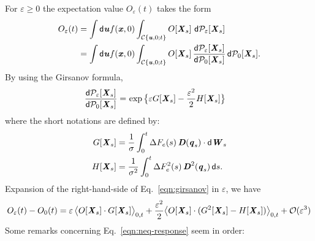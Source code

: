 \documentclass[aip,jcp,a4paper,reprint,onecolumn]{revtex4-1}
\newcommand{\vect}[1]{\textbf{\textit{#1}}}
\newcommand{\dd}{\textsf{d}}
\newcommand{\eps}{\varepsilon}
\newcommand{\mo}{\mathcal O}
\newcommand{\mc}{\mathcal C}
\begin{document}
For $\eps\ge 0$ the  expectation value $O_\eps(t)$ takes the form
\begin{align}
  O_\eps(t) & =
  \int \dd\vect u f(\vect x,0)
  \int_{\mc\{\vect u,0; t\}} O[\vect X_s]\,
  \, \dd\mathcal P_\eps[\vect X_s]   \\
& = \int \dd\vect u f(\vect x,0)
  \int_{\mc\{\vect u,0; t\}} O[\vect X_s]\,
  \frac{\dd {\mathcal P}_\eps[\vect X_s]}{\dd\mathcal P_0[\vect X_s]}
  \, \dd\mathcal P_0[\vect X_s] .   
\end{align}
By using the Girsanov formula, 
\begin{align}\label{eqn:girsanov}
  \frac
  {\dd{\mathcal P_\eps}[\vect X_s]}
  {\dd\mathcal P_0[\vect X_s]}  
  =&\,
  \exp
  \big\{{\eps G[\vect X_s] - \frac{\eps^2}{2} H[\vect X_s]}
  \big\}
\end{align}
where the short notations are defined by:
\begin{align}
  G[\vect X_s]
  &= \frac{1}\sigma\int_0^t
  \Delta F_e(s)\,\vect D(\vect q_s)\cdot\dd\vect W_s \\
  H[\vect X_s]
  &=
  \frac 1{\sigma^2}\int_0^t
  \Delta F_e^2(s)\,\vect D^2(\vect q_s)\,\dd s.
\end{align}
Expansion of the right-hand-side of Eq.~\eqref{eqn:girsanov} in $\eps$, we have
\begin{align}\label{eqn:neq-response}
   O_\eps(t) -
  O_0(t)
  =
  \eps\, \big\langle O[\vect X_s]\cdot G[\vect X_s]\big\rangle_{0,t}
  +
  \frac{\eps^2}{2} \big\langle O[\vect X_s] \cdot (G^2[\vect X_s] - H[\vect X_s] )\big\rangle_{0,t}
  +
  \mo (\eps^3)
\end{align}
Some remarks concerning Eq.~\eqref{eqn:neq-response} seem in order:
\end{document}
